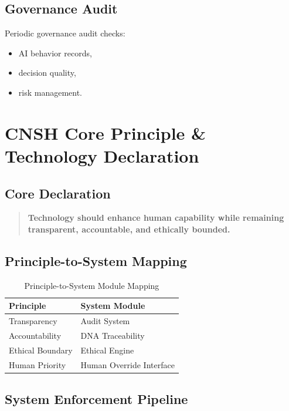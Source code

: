 \documentclass[conference]{IEEEtran}
\begin{document}
\subsection{Governance Audit}

Periodic governance audit checks:
\begin{itemize}[nosep]
  \item AI behavior records,
  \item decision quality,
  \item risk management.
\end{itemize}

\section{CNSH Core Principle \& Technology Declaration}

\subsection{Core Declaration}

\begin{quote}
\textbf{Technology should enhance human capability while remaining
transparent, accountable, and ethically bounded.}
\end{quote}

\subsection{Principle-to-System Mapping}

\begin{table}[t]
\centering
\caption{Principle-to-System Module Mapping}
\label{tab:principlemap}
\renewcommand{\arraystretch}{1.3}
\begin{tabular}{ll}
\toprule
\textbf{Principle} & \textbf{System Module} \\
\midrule
Transparency & Audit System \\
Accountability & DNA Traceability \\
Ethical Boundary & Ethical Engine \\
Human Priority & Human Override Interface \\
\bottomrule
\end{tabular}
\end{table}

\subsection{System Enforcement Pipeline}
\end{document}
